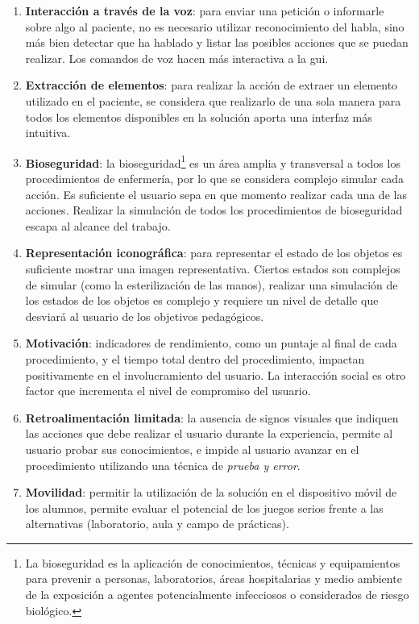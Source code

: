 \begin{enumerate}[\bfseries H1.:]

\item \textbf{Interacción a través de la voz}: para enviar una petición o
    informarle sobre algo al paciente, no es necesario utilizar reconocimiento
    del habla, sino más bien detectar que ha hablado y listar las posibles
    acciones que se puedan realizar. Los comandos de voz hacen más interactiva a
    la \gls{gui}.
    
\item \textbf{Extracción de elementos}: para realizar la acción de extraer un
    elemento utilizado en el paciente, se considera que realizarlo de una sola
    manera para todos los elementos disponibles en la solución aporta una
    interfaz más intuitiva.

\item \textbf{Bioseguridad}: la bioseguridad\footnote{La bioseguridad es la
        aplicación de conocimientos, técnicas y equipamientos para prevenir a
        personas, laboratorios, áreas hospitalarias y medio ambiente de la
        exposición a agentes potencialmente infecciosos o considerados de riesgo
        biológico\cite{world2005manual}.} es un área amplia y transversal a
    todos los procedimientos de enfermería, por lo que se considera complejo
    simular cada acción. Es suficiente el usuario sepa en que momento realizar
    cada una de las acciones. Realizar la simulación de todos los procedimientos
    de bioseguridad escapa al alcance del trabajo.

\item \textbf{Representación iconográfica}: para representar el estado de los
    objetos es suficiente mostrar una imagen representativa. Ciertos estados son
    complejos de simular (como la esterilización de las manos), realizar una
    simulación de los estados de los objetos es complejo y requiere un nivel de
    detalle que desviará al usuario de los objetivos pedagógicos.
    
\item \textbf{Motivación}: indicadores de rendimiento, como un puntaje al final
    de cada procedimiento, y el tiempo total dentro del procedimiento, impactan
    positivamente en el involucramiento del usuario. La interacción social es
    otro factor que incrementa el nivel de compromiso del usuario.

\item \textbf{Retroalimentación limitada}: la ausencia de signos visuales que
    indiquen las acciones que debe realizar el usuario durante la experiencia,
    permite al usuario probar sus conocimientos, e impide al usuario avanzar en
    el procedimiento utilizando una técnica de \emph{prueba y error}.

\item \textbf{Movilidad}: permitir la utilización de la solución en el
    dispositivo móvil de los alumnos, permite evaluar el potencial de los juegos
    serios frente a las alternativas (laboratorio, aula y campo de prácticas).

\end{enumerate}

